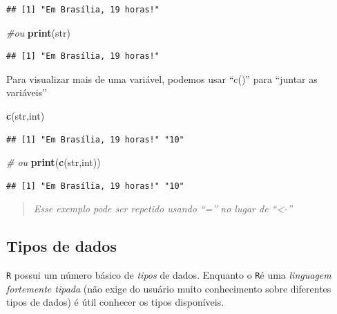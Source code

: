 \documentclass[
]{book}
\newenvironment{Shaded}{\begin{snugshade}}{\end{snugshade}}
\newcommand{\CommentTok}[1]{\textcolor[rgb]{0.56,0.35,0.01}{\textit{#1}}}
\newcommand{\KeywordTok}[1]{\textcolor[rgb]{0.13,0.29,0.53}{\textbf{#1}}}
\newcommand{\NormalTok}[1]{#1}
\theoremstyle{definition}
\theoremstyle{definition}
\theoremstyle{definition}
\theoremstyle{remark}
\begin{document}
\begin{verbatim}
## [1] "Em Brasília, 19 horas!"
\end{verbatim}

\begin{Shaded}
\begin{Highlighting}[]
\CommentTok{#ou}
\KeywordTok{print}\NormalTok{(str)}
\end{Highlighting}
\end{Shaded}

\begin{verbatim}
## [1] "Em Brasília, 19 horas!"
\end{verbatim}

Para visualizar mais de uma variável, podemos usar ``c()'' para ``juntar as variáveis''

\begin{Shaded}
\begin{Highlighting}[]
\KeywordTok{c}\NormalTok{(str,int)}
\end{Highlighting}
\end{Shaded}

\begin{verbatim}
## [1] "Em Brasília, 19 horas!" "10"
\end{verbatim}

\begin{Shaded}
\begin{Highlighting}[]
\CommentTok{# ou}
\KeywordTok{print}\NormalTok{(}\KeywordTok{c}\NormalTok{(str,int))}
\end{Highlighting}
\end{Shaded}

\begin{verbatim}
## [1] "Em Brasília, 19 horas!" "10"
\end{verbatim}

\begin{quote}
\emph{Esse exemplo pode ser repetido usando ``='' no lugar de ``\textless-''}
\end{quote}

\hypertarget{tipos-de-dados}{%
\subsection{Tipos de dados}\label{tipos-de-dados}}

\texttt{R} possui um número básico de \emph{tipos} de dados. Enquanto o \texttt{R}é uma \emph{linguagem fortemente tipada} (não exige do usuário muito conhecimento sobre diferentes tipos de dados) é útil conhecer os tipos disponíveis.
\end{document}
